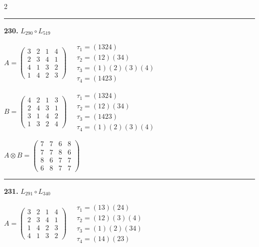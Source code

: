 \begin{multicols}{2}
\vspace{0.3em}
\hrule
\vspace{0.3em}

\noindent\textbf{230.} $L_{290} \circ L_{519}$

$A = \begin{pmatrix} 3 & 2 & 1 & 4 \\ 2 & 3 & 4 & 1 \\ 4 & 1 & 3 & 2 \\ 1 & 4 & 2 & 3 \end{pmatrix} \quad \begin{matrix} \tau_{1}=(1 3 2 4) \\ \tau_{2}=(1 2)(3 4) \\ \tau_{3}=(1)(2)(3)(4) \\ \tau_{4}=(1 4 2 3) \end{matrix}$

$B = \begin{pmatrix} 4 & 2 & 1 & 3 \\ 2 & 4 & 3 & 1 \\ 3 & 1 & 4 & 2 \\ 1 & 3 & 2 & 4 \end{pmatrix} \quad \begin{matrix} \tau_{1}=(1 3 2 4) \\ \tau_{2}=(1 2)(3 4) \\ \tau_{3}=(1 4 2 3) \\ \tau_{4}=(1)(2)(3)(4) \end{matrix}$

$A \otimes B = \begin{pmatrix} 7 & 7 & 6 & 8 \\ 7 & 7 & 8 & 6 \\ 8 & 6 & 7 & 7 \\ 6 & 8 & 7 & 7 \end{pmatrix}$

\vspace{0.3em}
\hrule
\vspace{0.3em}

\noindent\textbf{231.} $L_{291} \circ L_{340}$

$A = \begin{pmatrix} 3 & 2 & 1 & 4 \\ 2 & 3 & 4 & 1 \\ 1 & 4 & 2 & 3 \\ 4 & 1 & 3 & 2 \end{pmatrix} \quad \begin{matrix} \tau_{1}=(1 3)(2 4) \\ \tau_{2}=(1 2)(3)(4) \\ \tau_{3}=(1)(2)(3 4) \\ \tau_{4}=(1 4)(2 3) \end{matrix}$


\end{multicols}

